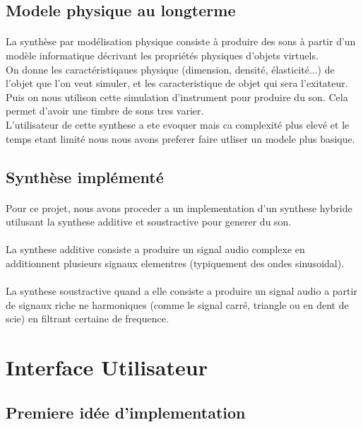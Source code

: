 \documentclass[a4paper, titlepage, oneside, 12pt]{article}%
\begin{document}
\subsection{Modele physique au longterme}
\paragraph{}
La synthèse par modélisation physique consiste à produire des sons à partir d'un modèle informatique décrivant les propriétés physiques d'objets virtuels.\\
On donne les caractéristiqaues physique (dimension, densité, élasticité...) de l'objet que l'on veut simuler, et les caracteristique de objet qui sera l'exitateur. Puis on nous utilison cette  simulation d'instrument pour produire du son. Cela permet d'avoir une timbre de sons tres varier.\\
L'utilisateur de cette synthese a ete evoquer mais ca complexité plus elevé et le temps etant limité nous nous avons preferer faire utliser un modele plus basique.

\subsection{Synthèse implémenté}
\paragraph{}
Pour ce projet, nous avons proceder a un implementation d'un synthese hybride utilusant la synthese additive et soustractive pour generer du son.\
\paragraph{}
La synthese additive consiste a produire un signal audio complexe en additionnent plusieurs signaux elementres (typiquement des ondes sinusoidal).
\paragraph{}
La synthese soustractive quand a elle consiste a produire un signal audio a partir de signaux riche ne harmoniques (comme le signal carré, triangle ou en dent de scie) en filtrant certaine de frequence. 


\section{Interface Utilisateur}
\subsection{Premiere idée d'implementation}
\end{document}
